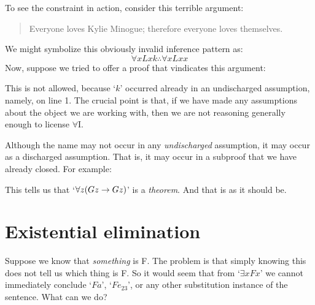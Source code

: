 To see the constraint in action, consider this terrible argument:
	\begin{quote}
		Everyone loves Kylie Minogue; therefore everyone loves themselves.
	\end{quote}
We might symbolize this obviously invalid inference pattern as:
$$\forall x Lxk \therefore \forall x Lxx$$
Now, suppose we tried to offer a proof that vindicates this argument:
\begin{pf}
	 
	 
\end{pf}\noindent
This is not allowed, because `$k$' occurred already in an undischarged assumption, namely, on line 1. The crucial point is that, if we have made any assumptions about the object we are working with, then we are not reasoning generally enough to license $\forall$I.

Although the name may not occur in any \emph{undischarged} assumption, it may occur as a discharged assumption. That is, it may occur in a subproof that we have already closed. For example:
\begin{pf}
	\open
	\close
\end{pf}
This tells us that `$\forall z (Gz \rightarrow Gz)$' is a \emph{theorem}. And that is as it should be.

\section{Existential elimination}
Suppose we know that \emph{something} is F. The problem is that simply knowing this does not tell us which thing is F. So it would seem that from `$\exists x Fx$' we cannot immediately conclude `$Fa$', `$Fe_{23}$', or any other substitution instance of the sentence. What can we do?

